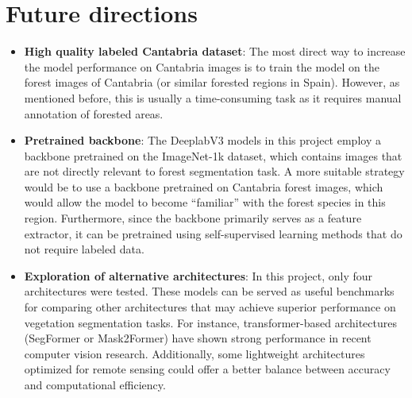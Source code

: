 \section{Future directions}
\begin{itemize}
    \item \textbf{High quality labeled Cantabria dataset}: The most direct way to increase the model performance on Cantabria images is to train the model on the forest images of Cantabria (or similar forested regions in Spain). However, as mentioned before, this is usually a time-consuming task as it requires manual annotation of forested areas.  
    \item \textbf{Pretrained backbone}: The DeeplabV3 models in this project employ a backbone pretrained on the ImageNet-1k dataset, which contains images that are not directly relevant to forest segmentation task. A more suitable strategy would be to use a backbone pretrained on Cantabria forest images, which would allow the model to become “familiar” with the forest species in this region. Furthermore, since the backbone primarily serves as a feature extractor, it can be pretrained using self-supervised learning methods that do not require labeled data. 
    \item \textbf{Exploration of alternative architectures}: In this project, only four architectures were tested. These models can be served as useful benchmarks for comparing other architectures that may achieve superior performance on vegetation segmentation tasks. For instance, transformer-based architectures (SegFormer or Mask2Former) have shown strong performance in recent computer vision research. Additionally, some lightweight architectures optimized for remote sensing could offer a better balance between accuracy and computational efficiency. 
\end{itemize}

 



 




 

 

 






 








